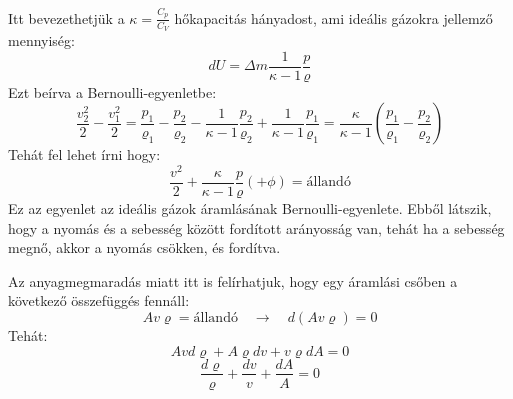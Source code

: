 \documentclass[../main.tex]{subfiles}
\begin{document}
Itt bevezethetjük a $\kappa = \frac{C_p}{C_V}$ hőkapacitás hányadost, ami ideális gázokra jellemző mennyiség:
\begin{equation}
    dU = \Delta m \frac{1}{\kappa - 1} \frac{p}{\varrho}
\end{equation}
Ezt beírva a Bernoulli-egyenletbe:
\begin{equation}
    \frac{v_2^2}{2} - \frac{v_1^2}{2} = \frac{p_1}{\varrho_1} - \frac{p_2}{\varrho_2} - \frac{1}{\kappa - 1} \frac{p_2}{\varrho_2} + \frac{1}{\kappa - 1} \frac{p_1}{\varrho_1} = \frac{\kappa}{\kappa - 1} \left(\frac{p_1}{\varrho_1} - \frac{p_2}{\varrho_2}\right)
\end{equation}
Tehát fel lehet írni hogy:
\begin{equation}
\frac{v^2}{2} + \frac{\kappa}{\kappa - 1} \frac{p}{\varrho} \left(+ \phi\right)= \text{állandó}
\end{equation}
Ez az egyenlet az ideális gázok áramlásának Bernoulli-egyenlete. Ebből látszik, hogy a nyomás és a sebesség között fordított arányosság van, tehát ha a sebesség megnő,
akkor a nyomás csökken, és fordítva.


Az anyagmegmaradás miatt itt is felírhatjuk, hogy egy áramlási csőben a következő összefüggés fennáll:
\begin{equation}
    A v \varrho = \text{állandó} \quad \rightarrow \quad d(A v \varrho) = 0
\end{equation}
Tehát:
\begin{equation}
    A v d\varrho + A \varrho dv + v \varrho dA = 0
\end{equation}
\begin{equation}
    \frac{d\varrho}{\varrho} + \frac{dv}{v} + \frac{dA}{A} = 0
\end{equation}
\end{document}

